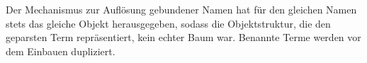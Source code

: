\documentclass[parskip=full,11pt,openany]{scrreprt}
\begin{document}
\begin{itemize}[itemsep=3ex]
\issue{}{}{}

\issue{}{}{}

{Der Mechanismus zur Auflösung gebundener Namen hat für den gleichen Namen stets das gleiche Objekt
herausgegeben, sodass die Objektstruktur, die den geparsten Term repräsentiert, kein echter Baum war.}
{Benannte Terme werden vor dem Einbauen dupliziert.}

\end{itemize}
\end{document}

